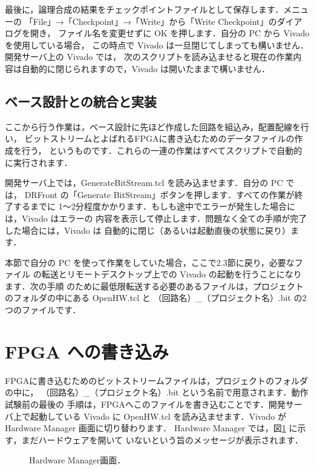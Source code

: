 最後に，論理合成の結果をチェックポイントファイルとして保存します．メニューの
「File」→「Checkpoint」→「Write」から「Write Checkpoint」のダイアログを開き，
ファイル名を変更せずに OK を押します．自分の PC から Vivado を使用している場合，
この時点で Vivado は一旦閉じてしまっても構いません．開発サーバ上の Vivado では，
次のスクリプトを読み込ませると現在の作業内容は自動的に閉じられますので，Vivado
は開いたままで構いません．

\subsection{ベース設計との統合と実装}

ここから行う作業は，ベース設計に先ほど作成した回路を組込み，配置配線を行い，
ビットストリームとよばれるFPGAに書き込むためのデータファイルの作成を行う，
というものです．これらの一連の作業はすべてスクリプトで自動的に実行されます．

開発サーバ上では，GenerateBitStream.tcl を読み込ませます．自分の PC では，
DRFront の「Generate BitStream」ボタンを押します．すべての作業が終了するまでに
1～2分程度かかります．もしも途中でエラーが発生した場合には，Vivado はエラーの
内容を表示して停止します．問題なく全ての手順が完了した場合には，Vivado は
自動的に閉じ（あるいは起動直後の状態に戻り）ます．

本節で自分の PC を使って作業をしていた場合，ここで2.3節に戻り，必要なファイル
の転送とリモートデスクトップ上での Vivado の起動を行うことになります．次の手順
のために最低限転送する必要のあるファイルは，プロジェクトのフォルダの中にある
OpenHW.tcl と （回路名）\_（プロジェクト名）.bit の2つのファイルです．

\section{FPGA への書き込み}

FPGAに書き込むためのビットストリームファイルは，プロジェクトのフォルダの中に，
（回路名）\_（プロジェクト名）.bit という名前で用意されます．動作試験前の最後の
手順は，FPGAへこのファイルを書き込むことです．開発サーバ上で起動している Vivado
に OpenHW.tcl を読み込ませます．Vivado が Hardware Manager 画面に切り替わります．
Hardware Manager では，図\ref{fig:Vivado1_12} に示す，まだハードウェアを開いて
いないという旨のメッセージが表示されます．

\begin{figure}[ht]
 \centering
 \caption{Hardware Manager画面．}
 \label{fig:Vivado1_12}
\end{figure}

